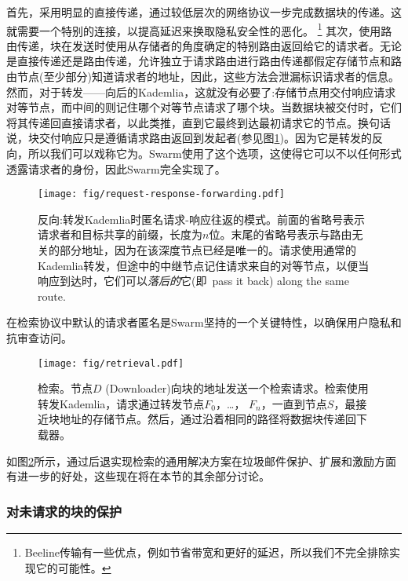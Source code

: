 首先，采用明显的直接传递，通过较低层次的网络协议一步完成数据块的传递。这就需要一个特别的连接，以提高延迟来换取隐私安全性的恶化。%
%
\footnote{Beeline传输有一些优点，例如节省带宽和更好的延迟，所以我们不完全排除实现它的可能性。 
}
其次，使用路由传递，块在发送时使用从存储者的角度确定的特别路由返回给它的请求者。无论是直接传递还是路由传递，允许独立于请求路由进行路由传递都假定存储节点和路由节点(至少部分)知道请求者的地址，因此，这些方法会泄漏标识请求者的信息。然而，对于转发——向后的Kademlia，这就没有必要了:存储节点用交付响应请求对等节点，而中间的则记住哪个对等节点请求了哪个块。当数据块被交付时，它们将其传递回直接请求者，以此类推，直到它最终到达最初请求它的节点。换句话说，块交付响应只是遵循请求路由返回到发起者(参见图\ref{fig:request-response})。因为它是转发的反向，所以我们可以戏称它为。Swarm使用了这个选项，这使得它可以不以任何形式透露请求者的身份，因此Swarm完全实现了。 

\begin{figure}[htbp]
   \centering
   \texttt{[image: fig/request-response-forwarding.pdf]}
   \caption[反向:转发Kademlia 时匿名请求-响应往返的模式\statusgreen]{反向:转发Kademlia时匿名请求-响应往返的模式。前面的省略号表示请求者和目标共享的前缀，长度为$n$位。末尾的省略号表示与路由无关的部分地址，因为在该深度节点已经是唯一的。请求使用通常的Kademlia转发，但途中的中继节点记住请求来自的对等节点，以便当响应到达时，它们可以\emph{落后的}它(即\ pass it back) along the same route.}
   \label{fig:request-response}
\end{figure}

在检索协议中默认的请求者匿名是Swarm坚持的一个关键特性，以确保用户隐私和抗审查访问。

\begin{figure}[htbp]
   \centering
   \texttt{[image: fig/retrieval.pdf]}
   \caption[检索\statusgreen]{检索。节点$D$ (Downloader)向块的地址发送一个检索请求。检索使用转发Kademlia，请求通过转发节点$F_0$，…， $F_n$，一直到节点$S$，最接近块地址的存储节点。然后，通过沿着相同的路径将数据块传递回下载器。}
   \label{fig:retrieval}
\end{figure}

如图\ref{fig:retrieval}所示，通过后退实现检索的通用解决方案在垃圾邮件保护、扩展和激励方面有进一步的好处，这些现在将在本节的其余部分讨论。

\subsubsection{对未请求的块的保护}

